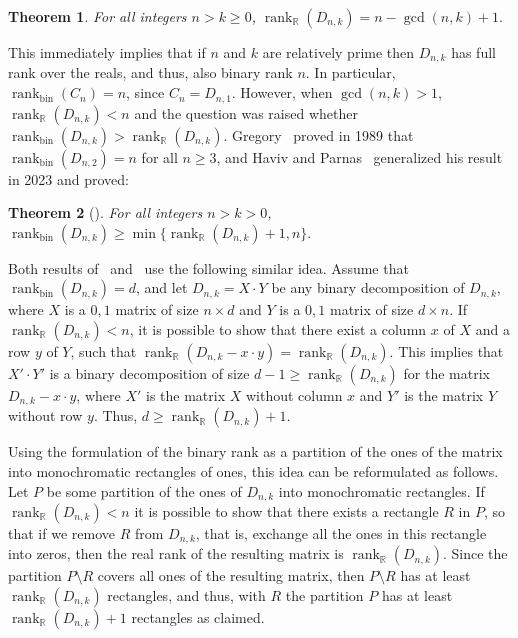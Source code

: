 \documentclass[11pt]{article}
\newtheorem{theorem}{Theorem}
\newcommand{\rank}{\mathop{\mathrm{rank}}}
\newcommand{\Rbin}{{\rank}_{\mathrm{bin}}}
\newcommand{\Rreal}{{\rank}_\mathbb{R}}
\begin{document}
\begin{theorem}
\label{theo-realDnk}
For all integers $n > k \geq 0$, $\Rreal(D_{n,k}) = n-\gcd(n,k)+1.$
\end{theorem}

This immediately implies that if $n$ and $k$ are relatively prime then $D_{n,k}$ has full rank over the reals, and thus, also binary rank $n$. In particular, $\Rbin(C_n) = n$,
since $C_n = D_{n,1}$.
However, when $\gcd(n,k) > 1$,  $\Rreal(D_{n,k}) < n$ and the question was raised whether  $\Rbin(D_{n,k}) > \Rreal(D_{n,k})$.
Gregory~\cite{gregory1989biclique}  proved in 1989 that $\Rbin(D_{n,2})=n$ for all $n \geq 3$,
and Haviv and Parnas~\cite{haviv2023binary}  generalized his result in 2023 and proved:

\begin{theorem}[\cite{haviv2023binary}]
\label{theo-binDnk}
For all integers $n > k >0$, $\Rbin(D_{n,k}) \geq \min\{\Rreal(D_{n,k})+1,n\}.$
\end{theorem}

Both results of~\cite{gregory1989biclique} and~\cite{haviv2023binary} use the following similar idea.
Assume that $\Rbin(D_{n,k}) = d$, and let $D_{n,k} = X \cdot Y$ be any binary decomposition of $D_{n,k}$,
where $X$ is a $0,1$ matrix of size $n \times d$ and $Y$ is a $0,1$ matrix of size $d \times n$.
If $\Rreal(D_{n,k}) < n$, it is possible to show that there exist a column $x$ of $X$ and a row $y$ of $Y$,
such that $\Rreal(D_{n,k} - x\cdot y) = \Rreal(D_{n,k})$.
This implies that $X' \cdot Y'$ is a binary decomposition of size $d-1 \geq \Rreal(D_{n,k})$ for the matrix $D_{n,k} - x \cdot y$,
where $X'$ is the matrix $X$ without column $x$ and $Y'$ is the matrix $Y$ without row $y$. Thus, $d \geq \Rreal(D_{n,k})+ 1$.

Using the formulation of the binary rank as a partition of the ones of the matrix into monochromatic rectangles of ones, this idea can be reformulated as follows.
Let $P$ be some partition of the ones of $D_{n,k}$ into monochromatic rectangles.
If $\Rreal(D_{n,k}) < n$ it is possible to show that there exists a rectangle $R$ in $P$,
so that if we remove $R$ from $D_{n,k}$, that is, exchange all the ones in this rectangle into zeros, then the real rank of the resulting matrix is $\Rreal(D_{n,k})$.
Since the partition $P \setminus R$ covers all ones of the resulting matrix, then $P \setminus R$ has at least $\Rreal(D_{n,k})$ rectangles, and
thus, with $R$ the partition $P$ has at least $\Rreal(D_{n,k})+1$ rectangles as claimed.
\end{document}
